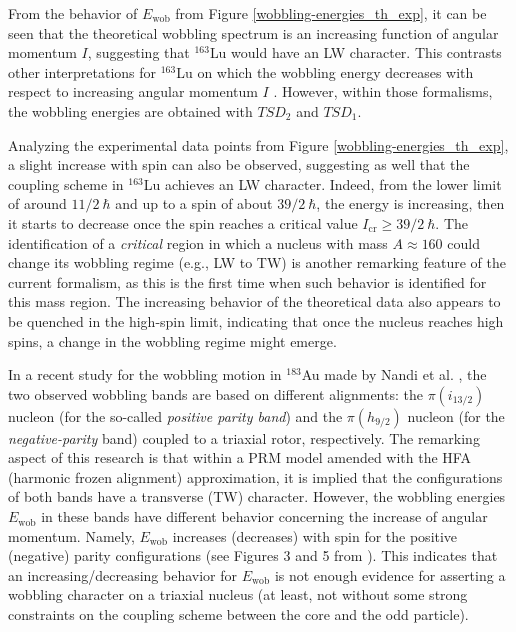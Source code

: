\documentclass[myclassdoc,debug]{rjparticle}
\begin{document}
From the behavior of $E_\text{wob}$ from Figure \ref{wobbling-energies_th_exp}, it can be seen that the theoretical wobbling spectrum is an increasing function of angular momentum $I$, suggesting that $^{163}$Lu would have an LW character. This contrasts other interpretations for $^{163}$Lu on which the wobbling energy decreases with respect to increasing angular momentum $I$  \cite{frauendorf2014transverse,frauendorf2018comment}. However, within those formalisms, the wobbling energies are obtained with $TSD_2$ and $TSD_1$.

Analyzing the experimental data points from Figure \ref{wobbling-energies_th_exp}, a slight increase with spin can also be observed, suggesting as well that the coupling scheme in $^{163}$Lu achieves an LW character. Indeed, from the lower limit of around $11/2\ \hbar$ and up to a spin of about $39/2\ \hbar$, the energy is increasing, then it starts to decrease once the spin reaches a critical value $I_\text{cr}\geq39/2\ \hbar$. The identification of a \emph{critical} region in which a nucleus with mass $A\approx160$ could change its wobbling regime (e.g., LW to TW) is another remarking feature of the current formalism, as this is the first time when such behavior is identified for this mass region. The increasing behavior of the theoretical data also appears to be quenched in the high-spin limit, indicating that once the nucleus reaches high spins, a change in the wobbling regime might emerge.

In a recent study for the wobbling motion in $^{183}$Au made by Nandi et al. \cite{nandi2020first}, the two observed wobbling bands are based on different alignments: the $\pi(i_{13/2})$ nucleon (for the so-called \emph{positive parity band}) and the $\pi(h_{9/2})$ nucleon (for the \emph{negative-parity} band) coupled to a triaxial rotor, respectively. The remarking aspect of this research is that within a PRM model amended with the HFA (harmonic frozen alignment) approximation, it is implied that the configurations of both bands have a transverse (TW) character. However, the wobbling energies $E_\text{wob}$ in these bands have different behavior concerning the increase of angular momentum. Namely, $E_\text{wob}$ increases (decreases) with spin for the positive (negative) parity configurations (see Figures 3 and 5 from \cite{nandi2020first}). This indicates that an increasing/decreasing behavior for $E_\text{wob}$ is not enough evidence for asserting a wobbling character on a triaxial nucleus (at least, not without some strong constraints on the coupling scheme between the core and the odd particle).
\end{document}
